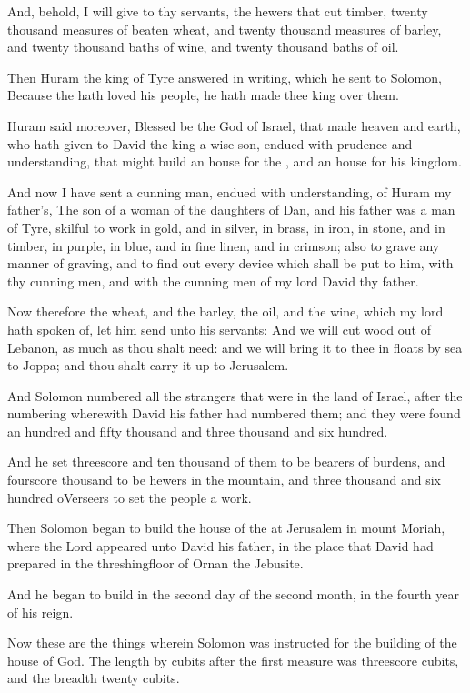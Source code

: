 \Verse And, behold, I will give to thy servants, the hewers that cut timber, twenty thousand measures of beaten wheat, and twenty thousand measures of barley, and twenty thousand baths of wine, and twenty thousand baths of oil.

\Verse Then Huram the king of Tyre answered in writing, which he sent to Solomon, Because the \LORD hath loved his people, he hath made thee king over them.

\Verse Huram said moreover, Blessed be the \LORD God of Israel, that made heaven and earth, who hath given to David the king a wise son, endued with prudence and understanding, that might build an house for the \LORD, and an house for his kingdom.

\Verse And now I have sent a cunning man, endued with understanding, of Huram my father's, \Verse The son of a woman of the daughters of Dan, and his father was a man of Tyre, skilful to work in gold, and in silver, in brass, in iron, in stone, and in timber, in purple, in blue, and in fine linen, and in crimson; also to grave any manner of graving, and to find out every device which shall be put to him, with thy cunning men, and with the cunning men of my lord David thy father.

\Verse Now therefore the wheat, and the barley, the oil, and the wine, which my lord hath spoken of, let him send unto his servants: \Verse And we will cut wood out of Lebanon, as much as thou shalt need: and we will bring it to thee in floats by sea to Joppa; and thou shalt carry it up to Jerusalem.

\Verse And Solomon numbered all the strangers that were in the land of Israel, after the numbering wherewith David his father had numbered them; and they were found an hundred and fifty thousand and three thousand and six hundred.

\Verse And he set threescore and ten thousand of them to be bearers of burdens, and fourscore thousand to be hewers in the mountain, and three thousand and six hundred oVerseers to set the people a work.


\Chapter
\Verse Then Solomon began to build the house of the \LORD at Jerusalem in mount Moriah, where the Lord appeared unto David his father, in the place that David had prepared in the threshingfloor of Ornan the Jebusite.

\Verse And he began to build in the second day of the second month, in the fourth year of his reign.

\Verse Now these are the things wherein Solomon was instructed for the building of the house of God. The length by cubits after the first measure was threescore cubits, and the breadth twenty cubits.

